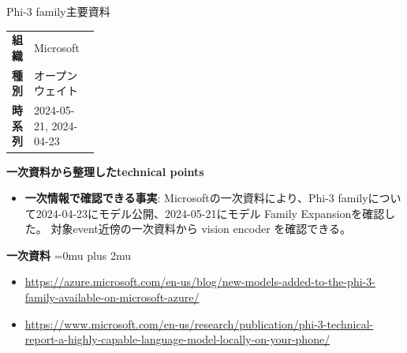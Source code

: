 \begin{technicalnote}{Phi-3 family}{主要資料}
\begingroup
\begin{tabularx}{\linewidth}{@{}>{\bfseries}p{0.22\linewidth}X@{}}
組織 & Microsoft \\
種別 & オープンウェイト \\
時系列 & 2024-05-21, 2024-04-23 \\
\end{tabularx}
\smallskip
\begin{minipage}{\linewidth}
{\bfseries 一次資料から整理したtechnical points}
\begin{itemize}[leftmargin=1.5em,itemsep=0.35em]
\item \textbf{一次情報で確認できる事実}: Microsoftの一次資料により、Phi-3 familyについて2024-04-23にモデル公開、2024-05-21にモデル Family Expansionを確認した。 対象event近傍の一次資料から vision encoder を確認できる。
\end{itemize}
\begin{minipage}{\linewidth}
\begin{samepage}
{\bfseries 一次資料}
\begingroup\sloppy
\Urlmuskip=0mu plus 2mu\relax
\begin{itemize}[leftmargin=1.5em,itemsep=0.25em]
\item {\scriptsize\url{https://azure.microsoft.com/en-us/blog/new-models-added-to-the-phi-3-family-available-on-microsoft-azure/}}
\item {\scriptsize\url{https://www.microsoft.com/en-us/research/publication/phi-3-technical-report-a-highly-capable-language-model-locally-on-your-phone/}}
\end{itemize}
\endgroup
\end{samepage}
\end{minipage}
\end{minipage}
\endgroup
\end{technicalnote}
\medskip

